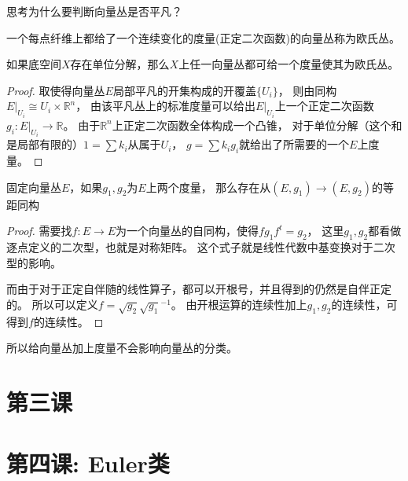     \begin{exercise}
        思考为什么要判断向量丛是否平凡？
    \end{exercise}

    \begin{definition}
        一个每点纤维上都给了一个连续变化的度量(正定二次函数)的向量丛称为欧氏丛。
    \end{definition}

    \begin{proposition}
        如果底空间$X$存在单位分解，那么$X$上任一向量丛都可给一个度量使其为欧氏丛。
    \end{proposition}
    
    \begin{proof}
        取使得向量丛$E$局部平凡的开集构成的开覆盖$\{U_i\}$，
        则由同构$E|_{U_i}\cong U_i\times \mathbb{R}^n$，
        由该平凡丛上的标准度量可以给出$E|_{U_i}$上一个正定二次函数
        $g_i:E|_{U_i}\to \mathbb{R}$。
        由于$\mathbb{R}^n$上正定二次函数全体构成一个凸锥，
        对于单位分解（这个和是局部有限的）$1=\sum k_i$从属于$U_i$，
        $g=\sum k_i g_i$就给出了所需要的一个$E$上度量。
    \end{proof}

    \begin{proposition}
        固定向量丛$E$，如果$g_1,g_2$为$E$上两个度量，
        那么存在从$(E,g_1)\to(E,g_2)$的等距同构
    \end{proposition}
    \begin{proof}
        需要找$f:E\to E$为一个向量丛的自同构，使得$fg_1f^t=g_2$，
        这里$g_1,g_2$都看做逐点定义的二次型，也就是对称矩阵。
        这个式子就是线性代数中基变换对于二次型的影响。

        \qquad 而由于对于正定自伴随的线性算子，都可以开根号，并且得到的仍然是自伴正定的。
        所以可以定义$f=\sqrt{g_2}\sqrt{g_1}^{-1}$。
        由开根运算的连续性加上$g_1,g_2$的连续性，可得到$f$的连续性。
    \end{proof}

    \begin{remark}
        所以给向量丛加上度量不会影响向量丛的分类。
    \end{remark}



\section{第三课}

\section{第四课: Euler类}

